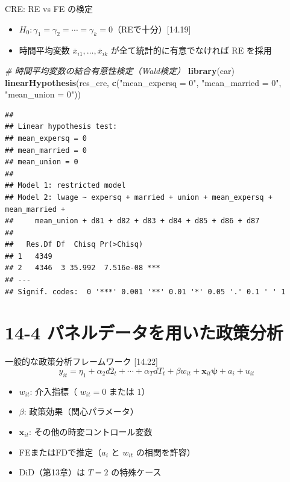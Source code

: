 \documentclass[
  ignorenonframetext,
]{beamer}
\newenvironment{Shaded}{\begin{snugshade}}{\end{snugshade}}
\newcommand{\CommentTok}[1]{\textcolor[rgb]{0.56,0.35,0.01}{\textit{#1}}}
\newcommand{\FunctionTok}[1]{\textcolor[rgb]{0.13,0.29,0.53}{\textbf{#1}}}
\newcommand{\NormalTok}[1]{#1}
\newcommand{\StringTok}[1]{\textcolor[rgb]{0.31,0.60,0.02}{#1}}
\providecommand{\tightlist}{%
  \setlength{\itemsep}{0pt}\setlength{\parskip}{0pt}}
\begin{document}
\begin{frame}[fragile]{CRE: RE vs FE の検定}
\label{cre-re-vs-fe-ux306eux691cux5b9a}
\begin{itemize}
\tightlist
\item
  \(H_0: \gamma_1 = \gamma_2 = \cdots = \gamma_k = 0\)（REで十分）{[}14.19{]}
\item
  時間平均変数 \(\bar{x}_{i1}, \dots, \bar{x}_{ik}\)
  が全て統計的に有意でなければ RE を採用
\end{itemize}

\footnotesize

\begin{Shaded}
\begin{Highlighting}[]
\CommentTok{\# 時間平均変数の結合有意性検定（Wald検定）}
\FunctionTok{library}\NormalTok{(car)}
\FunctionTok{linearHypothesis}\NormalTok{(res\_cre,}
                 \FunctionTok{c}\NormalTok{(}\StringTok{"mean\_expersq = 0"}\NormalTok{,}
                   \StringTok{"mean\_married = 0"}\NormalTok{,}
                   \StringTok{"mean\_union = 0"}\NormalTok{))}
\end{Highlighting}
\end{Shaded}

\begin{verbatim}
## 
## Linear hypothesis test:
## mean_expersq = 0
## mean_married = 0
## mean_union = 0
## 
## Model 1: restricted model
## Model 2: lwage ~ expersq + married + union + mean_expersq + mean_married + 
##     mean_union + d81 + d82 + d83 + d84 + d85 + d86 + d87
## 
##   Res.Df Df  Chisq Pr(>Chisq)    
## 1   4349                         
## 2   4346  3 35.992  7.516e-08 ***
## ---
## Signif. codes:  0 '***' 0.001 '**' 0.01 '*' 0.05 '.' 0.1 ' ' 1
\end{verbatim}

\normalsize
\end{frame}

\section{14-4
パネルデータを用いた政策分析}\label{ux30d1ux30cdux30ebux30c7ux30fcux30bfux3092ux7528ux3044ux305fux653fux7b56ux5206ux6790}

\begin{frame}{一般的な政策分析フレームワーク {[}14.22{]}}
\label{ux4e00ux822cux7684ux306aux653fux7b56ux5206ux6790ux30d5ux30ecux30fcux30e0ux30efux30fcux30af-14.22}
\[y_{it} = \eta_1 + \alpha_2 d2_t + \cdots + \alpha_T dT_t + \beta w_{it} + \mathbf{x}_{it}\boldsymbol{\psi} + a_i + u_{it}\]

\begin{itemize}
\tightlist
\item
  \(w_{it}\): 介入指標（ \(w_{it} = 0\) または \(1\)）
\item
  \(\beta\): 政策効果（関心パラメータ）
\item
  \(\mathbf{x}_{it}\): その他の時変コントロール変数
\item
  FEまたはFDで推定（\(a_i\) と \(w_{it}\) の相関を許容）
\item
  DiD（第13章）は \(T = 2\) の特殊ケース
\end{itemize}
\end{frame}
\end{document}
